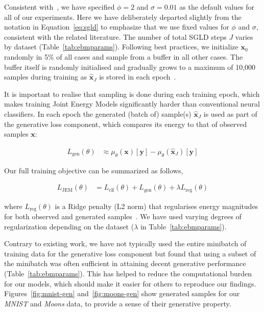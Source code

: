 Consistent with~\citet{grathwohl2020your}, we have specified $\phi=2$ and $\sigma=0.01$ as the default values for all of our experiments. Here we have deliberately departed slightly from the notation in Equation~\ref{eq:sgld} to emphasize that we use fixed values for $\phi$ and $\sigma$, consistent with the related literature. The number of total SGLD steps $J$ varies by dataset (Table~\ref{tab:ebmparams}). Following best practices, we initialize $\mathbf{x}_0$ randomly in 5\% of all cases and sample from a buffer in all other cases. The buffer itself is randomly initialised and gradually grows to a maximum of 10,000 samples during training as $\hat{\mathbf{x}}_{J}$ is stored in each epoch~\citep{du2019implicit,grathwohl2020your}. 

It is important to realise that sampling is done during each training epoch, which makes training Joint Energy Models significantly harder than conventional neural classifiers. In each epoch the generated (batch of) sample(s) $\hat{\mathbf{x}}_{J}$ is used as part of the generative loss component, which compares its energy to that of observed samples $\mathbf{x}$: 

\begin{equation}\label{eq:gen-loss}
  \begin{aligned}
    L_{\text{gen}}(\theta)&\approx\mu_{\theta}(\mathbf{x})[\mathbf{y}]-\mu_{\theta}(\hat{\mathbf{x}}_{J})[\mathbf{y}]
  \end{aligned}
\end{equation}

Our full training objective can be summarized as follows,

\begin{equation}\label{eq:jem-loss}
  \begin{aligned}
    L_{\text{JEM}}(\theta) &= L_{\text{clf}}(\theta) + L_{\text{gen}}(\theta) + \lambda L_{\text{reg}}(\theta) 
  \end{aligned}
\end{equation}

where $L_{\text{reg}}(\theta)$ is a Ridge penalty (L2 norm) that regularises energy magnitudes for both observed and generated samples~\citep{du2019implicit}. We have used varying degrees of regularization depending on the dataset ($\lambda$ in Table~\ref{tab:ebmparams}). 

Contrary to existing work, we have not typically used the entire minibatch of training data for the generative loss component but found that using a subset of the minibatch was often sufficient in attaining decent generative performance (Table~\ref{tab:ebmparams}). This has helped to reduce the computational burden for our models, which should make it easier for others to reproduce our findings. Figures~\ref{fig:mnist-gen} and~\ref{fig:moons-gen} show generated samples for our \textit{MNIST} and \textit{Moons} data, to provide a sense of their generative property.

